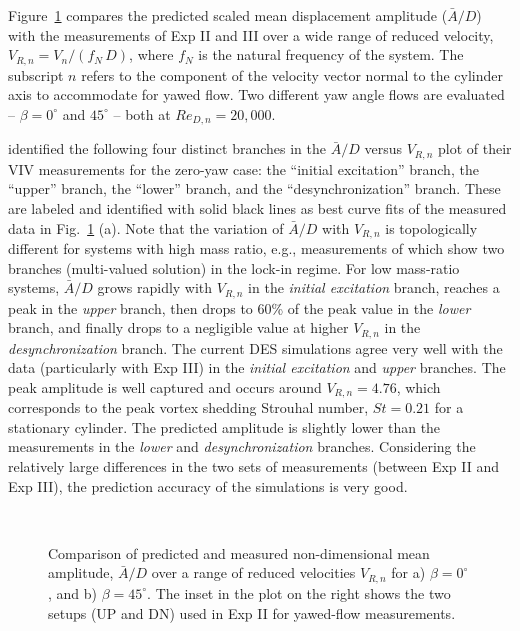 Figure~\ref{fig:VIV_amp} compares the predicted scaled mean displacement
amplitude ($\bar{A}/D$) with the measurements of Exp II and III over a wide
range of reduced velocity, $V_{R,n} = V_n/(f_N\,D)$, where $f_N$ is the natural
frequency of the system. The subscript $n$ refers to the component of the
velocity vector normal to the cylinder axis to accommodate for yawed flow. Two
different yaw angle flows are evaluated -- $\beta=0^\circ$ and $45^\circ$ --
both at $Re_{D,n}=20,000$.

\citet{khalak1997fluid} identified the following four distinct branches in the
$\bar{A}/D$ versus $V_{R,n}$ plot of their VIV measurements for the zero-yaw
case: the ``initial excitation'' branch, the ``upper'' branch, the ``lower''
branch, and the ``desynchronization'' branch. These are labeled and identified
with solid black lines as best curve fits of the measured data in
Fig.~\ref{fig:VIV_amp} (a). Note that the variation of $\bar{A}/D$ with
$V_{R,n}$ is topologically different for systems with high mass ratio, e.g.,
measurements of \citet{feng1968measurement} which show two branches
(multi-valued solution) in the lock-in regime.  For low mass-ratio systems,
$\bar{A}/D$ grows rapidly with $V_{R,n}$ in the {\em initial excitation}
branch, reaches a peak in the {\em upper} branch, then drops to 60\% of the
peak value in the {\em lower} branch, and finally drops to a negligible value
at higher $V_{R,n}$ in the {\em desynchronization} branch. The current DES
simulations agree very well with the data (particularly with Exp III) in the
{\em initial excitation} and {\em upper} branches. The peak amplitude is well
captured and occurs around $V_{R,n}=4.76$, which corresponds to the peak vortex
shedding Strouhal number, $St=0.21$ for a stationary cylinder. The predicted
amplitude is slightly lower than the measurements in the {\em lower} and {\em
desynchronization} branches. Considering the relatively large differences in
the two sets of measurements (between Exp II and Exp III), the prediction
accuracy of the simulations is very good.
%
\begin{figure}[htb!]
  \centering
   {}
  \qquad
   \\
    \caption{Comparison of predicted and measured non-dimensional mean
      amplitude, $\bar{A}/D$ over a range of reduced velocities $V_{R,n}$ for
      a) $\beta=0^\circ$, and b) $\beta=45^\circ$. The inset in the plot on the
      right shows the two setups (UP and DN) used in Exp II for yawed-flow
      measurements.} 
  \label{fig:VIV_amp}
\end{figure}

